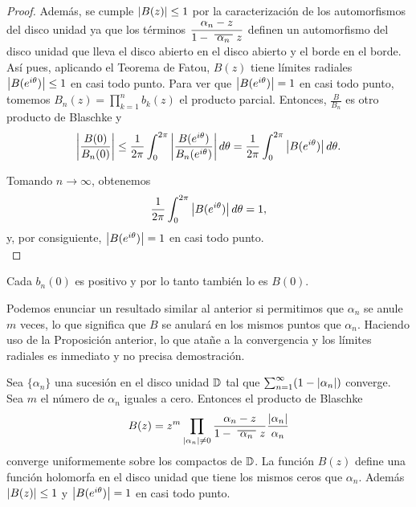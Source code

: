 \begin{proof}
    Además, se cumple $\left\lvert B(z)\right\rvert \leq 1$ por la caracterización de los automorfismos del disco unidad ya que los términos $\dfrac{\alpha_n - z}{1 - \xbar{\alpha_n}z}$ definen un automorfismo del disco unidad que lleva el disco abierto en el disco abierto y el borde en el borde. \\

    Así pues, aplicando el Teorema de Fatou, $B(z)$ tiene límites radiales $\left\lvert B(e^{i\theta})\right\rvert \leq 1$ en casi todo punto. Para ver que $\left\lvert B(e^{i \theta})\right\rvert = 1$ en casi todo punto, tomemos $B_n(z) = \prod_{k=1}^{n} b_k(z)$ el producto parcial. Entonces, $\frac{B}{B_n}$ es otro producto de Blaschke y
    \begin{equation*}
        \left\lvert\frac{B(0)}{B_n(0)}\right\rvert \leq \frac{1}{2 \pi} \int_{0}^{2 \pi} \left\lvert\frac{B(e^{i \theta})}{B_n(e^{i \theta})}\right\rvert d \theta = \frac{1}{2 \pi}  \int_{0}^{2 \pi} \left\lvert B(e^{i \theta})\right\rvert d \theta.
    \end{equation*}

    Tomando $n \to \infty$, obtenemos
    \begin{equation*}
         \frac{1}{2 \pi}  \int_{0}^{2 \pi} \left\lvert B(e^{i \theta})\right\rvert d \theta = 1,
    \end{equation*}
    y, por consiguiente, $\left\lvert B(e^{i \theta})\right\rvert = 1$ en casi todo punto. \\
\end{proof}

\begin{obs}
     Cada $b_n(0)$ es positivo y por lo tanto también lo es $B(0)$. \\
\end{obs}

Podemos enunciar un resultado similar al anterior si permitimos que $\alpha_n$ se anule $m$ veces, lo que significa que $B$ se anulará en los mismos puntos que $\alpha_n$. Haciendo uso de la Proposición anterior, lo que atañe a la convergencia y los límites radiales es inmediato y no precisa demostración. \\

\begin{corollary}
    Sea $\{\alpha_n\}$ una sucesión en el disco unidad $\mathbb{D}$ tal que $\sum_{n=1}^{\infty} (1 - \left\lvert\alpha_n\right\rvert)$ converge. Sea $m$ el número de $\alpha_n$ iguales a cero. Entonces el producto de Blaschke
\begin{equation*}
    B(z) = z^m \prod_{\abs{\alpha_n} \not = 0} \frac{\alpha_n - z}{1 - \xbar{\alpha_n}z} \dfrac{\abs{\alpha_n}}{\alpha_n}
\end{equation*}
converge uniformemente sobre los compactos de $\mathbb{D}$. La función $B(z)$ define una función holomorfa en el disco unidad que tiene los mismos ceros que $\alpha_n$. Además $\left\lvert B(z)\right\rvert \leq 1$ y $\left\lvert B(e^{i \theta})\right\rvert = 1$ en casi todo punto. \\
\end{corollary}

